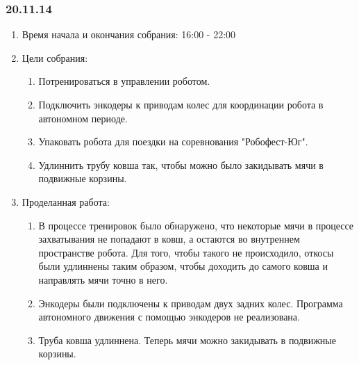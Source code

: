 \subsubsection{20.11.14}

\begin{enumerate}
	\item Время начала и окончания собрания:
	16:00 - 22:00
	\item Цели собрания:
	\begin{enumerate}
	  \item Потренироваться в управлении роботом.
	  
	  \item Подключить энкодеры к приводам колес для координации робота в автономном периоде.
	  
	  \item Упаковать робота для поездки на соревнования "Робофест-Юг".
	  
	  \item Удлиннить трубу ковша так, чтобы можно было закидывать мячи в подвижные корзины.
	  
    \end{enumerate}
	\item Проделанная работа:
	\begin{enumerate}
	  \item В процессе тренировок было обнаружено, что некоторые мячи в процессе захватывания не попадают в ковш, а остаются во внутреннем пространстве робота. Для того, чтобы такого не происходило, откосы были удлиннены таким образом, чтобы доходить до самого ковша и направлять мячи точно в него.
	  
      
      \item Энкодеры были подключены к приводам двух задних колес. Программа автономного движения с помощью энкодеров не реализована.
      
      \item Труба ковша удлиннена. Теперь мячи можно закидывать в подвижные корзины.
      

\end{enumerate}
\end{enumerate}
